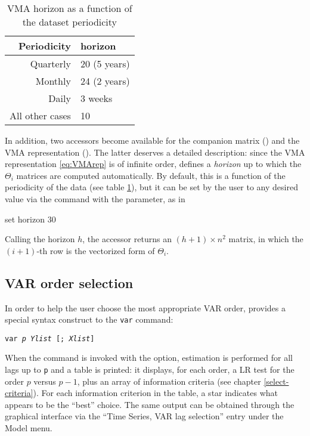 \begin{table}[htbp]
  \centering
  \begin{tabular}{rl}
    \hline
    Periodicity & horizon \\
    \hline
    Quarterly & 20 (5 years) \\
    Monthly & 24 (2 years) \\
    Daily & 3 weeks \\
    All other cases & 10 \\
    \hline
  \end{tabular}
  \caption{VMA horizon as a function of the dataset periodicity}
  \label{tab:var-horizon}
\end{table}

In addition, two accessors become available for the companion matrix
() and the VMA representation (). The
latter deserves a detailed description: since the VMA representation
\eqref{eq:VMArep} is of infinite order,  defines a
\emph{horizon} up to which the $\Theta_i$ matrices are computed
automatically. By default, this is a function of the periodicity of
the data (see table \ref{tab:var-horizon}), but it can be set by the
user to any desired value via the  command with the
 parameter, as in
\begin{code}
set horizon 30
\end{code}
Calling the horizon $h$, the  accessor returns an $(h+1)
\times n^2$ matrix, in which the $(i+1)$-th row is the vectorized form
of $\Theta_i$.

\subsection{VAR order selection}

In order to help the user choose the most appropriate VAR order,
 provides a special syntax construct to the \texttt{var}
command:
\begin{flushleft}
  \texttt{var \emph{p} \emph{Ylist} [; \emph{Xlist}]} 
\end{flushleft}
When the command is invoked with the  option,
estimation is performed for all lags up to \texttt{p} and a table is
printed: it displays, for each order, a LR test for the order $p$
versus $p-1$, plus an array of information criteria (see chapter
\ref{select-criteria}). For each information criterion in the table, a
star indicates what appears to be the ``best'' choice. The same output
can be obtained through the graphical interface via the ``Time Series,
VAR lag selection'' entry under the Model menu.


